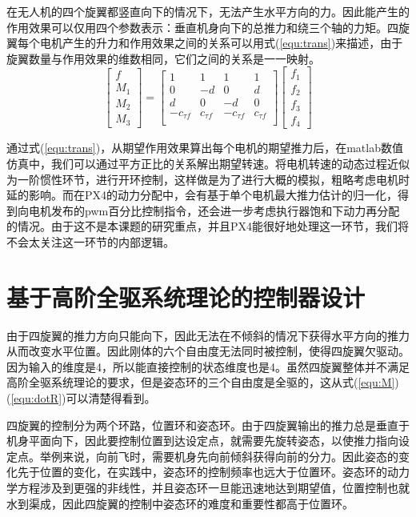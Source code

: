 在无人机的四个旋翼都竖直向下的情况下，无法产生水平方向的力。因此能产生的作用效果可以仅用四个参数表示：垂直机身向下的总推力和绕三个轴的力矩。四旋翼每个电机产生的升力和作用效果之间的关系可以用式(\ref{equ:trans})来描述，由于旋翼数量与作用效果的维数相同，它们之间的关系是一一映射。
\begin{equation}
  \begin{bmatrix}
    f \\
    M_1 \\
     M_2\\M_3
    \end{bmatrix}=\begin{bmatrix}
    1 &1  & 1 & 1 \\
    0 & -d & 0 & d \\
    d & 0 & -d & 0 \\
    -c_{\tau f} & c_{\tau f} & -c_{\tau f} & c_{\tau f} \\
    \end{bmatrix}\begin{bmatrix}
     f_1\\
    f_2 \\
     f_3\\f_4
    \end{bmatrix}  
    \label{equ:trans}
\end{equation}

通过式(\ref{equ:trans})，从期望作用效果算出每个电机的期望推力后，在matlab数值仿真中，我们可以通过平方正比的关系解出期望转速。将电机转速的动态过程近似为一阶惯性环节，进行开环控制，这样做是为了进行大概的模拟，粗略考虑电机时延的影响。而在PX4的动力分配中，会有基于单个电机最大推力估计的归一化，得到向电机发布的pwm百分比控制指令，还会进一步考虑执行器饱和下动力再分配的情况。由于这不是本课题的研究重点，并且PX4能很好地处理这一环节，我们将不会太关注这一环节的内部逻辑。


\section{基于高阶全驱系统理论的控制器设计}

由于四旋翼的推力方向只能向下，因此无法在不倾斜的情况下获得水平方向的推力从而改变水平位置。因此刚体的六个自由度无法同时被控制，使得四旋翼欠驱动。因为输入的维度是4，所以能直接控制的状态维度也是4。虽然四旋翼整体并不满足高阶全驱系统理论的要求，但是姿态环的三个自由度是全驱的，这从式(\ref{equ:M})(\ref{equ:dotR})可以清楚得看到。

四旋翼的控制分为两个环路，位置环和姿态环。由于四旋翼输出的推力总是垂直于机身平面向下，因此要控制位置到达设定点，就需要先旋转姿态，以使推力指向设定点。举例来说，向前飞时，需要机身先向前倾斜获得向前的分力。因此姿态的变化先于位置的变化，在实践中，姿态环的控制频率也远大于位置环。姿态环的动力学方程涉及到更强的非线性，并且姿态环一旦能迅速地达到期望值，位置控制也就水到渠成，因此四旋翼的控制中姿态环的难度和重要性都高于位置环。

